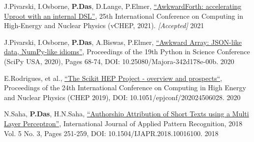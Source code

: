 \documentclass[10pt, letterpaper]{fulldeps}
\begin{document}
%
%
\small{\begin{tightitemize}
    \item J.Pivarski, I.Osborne, {\textbf{P.Das}}, D.Lange, P.Elmer, {\href{https://arxiv.org/abs/2102.13516}{``AwkwardForth: accelerating Uproot with an internal DSL''}}, 25th International Conference on Computing in High-Energy and Nuclear Physics (vCHEP, 2021). \emph{[Accepted]} \hfill{2021}
    \item J.Pivarski, I.Osborne, {\textbf{P.Das}}, A.Biswas, P.Elmer, {\href{http://conference.scipy.org/proceedings/scipy2020/jim_pivarski.html}{``Awkward Array: JSON-like data, NumPy-like idioms''}}, Proceedings of the 19th Python in Science Conference (SciPy USA, 2020), Pages 68-74, DOI: 10.25080/Majora-342d178e-00b. \hfill{2020}
    \item E.Rodrigues, et al., {\href{https://www.epj-conferences.org/articles/epjconf/abs/2020/21/epjconf_chep2020_06028/epjconf_chep2020_06028.html}{``The Scikit HEP Project - overview and prospects``}}, Proceedings of the 24th International Conference on Computing in High Energy and Nuclear Physics (CHEP 2019), DOI: 10.1051/epjconf/202024506028.  \hfill{2020}
    \item N.Saha, {\textbf{P.Das}}, H.N.Saha, {\href{https://www.inderscienceonline.com/doi/abs/10.1504/IJAPR.2018.094819}{``Authorship Attribution of Short Texts using a Multi Layer Perceptron''}}, International Journal of Applied Pattern Recognition, 2018 Vol. 5 No. 3, Pages 251-259, DOI: 10.1504/IJAPR.2018.10016100. \hfill{2018}
\end{tightitemize}}
\end{document}
